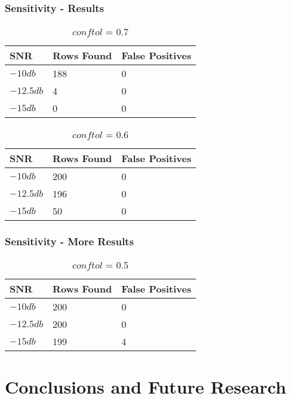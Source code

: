 \documentclass[
	11pt, %
]{beamer}
\begin{document}
\begin{frame}
	\frametitle{Sensitivity - Results}
	
	\begin{table}
		\begin{tabular}{l l l}
			\toprule
			\textbf{SNR} & \textbf{Rows Found} & \textbf{False Positives}\\
			\midrule
			$-10db$ & 188 & 0 \\
			$-12.5db$ & 4 & 0 \\
			$-15db$ & 0 & 0 \\
			\bottomrule
		\end{tabular}
		\caption{$conftol$ = 0.7}
	\end{table}
    \pause
    \begin{table}
		\begin{tabular}{l l l}
			\toprule
			\textbf{SNR} & \textbf{Rows Found} & \textbf{False Positives}\\
			\midrule
			$-10db$ & 200 & 0 \\
			$-12.5db$ & 196 & 0 \\
			$-15db$ & 50 & 0 \\
			\bottomrule
		\end{tabular}
		\caption{$conftol$ = 0.6}
	\end{table}
\end{frame}

\begin{frame}
	\frametitle{Sensitivity - More Results}
	
	\begin{table}
		\begin{tabular}{l l l}
			\toprule
			\textbf{SNR} & \textbf{Rows Found} & \textbf{False Positives}\\
			\midrule
			$-10db$ & 200 & 0 \\
			$-12.5db$ & 200 & 0 \\
			$-15db$ & 199 & 4 \\
			\bottomrule
		\end{tabular}
		\caption{$conftol$ = 0.5}
	\end{table}
\end{frame}


\section{Conclusions and Future Research}
\end{document}
